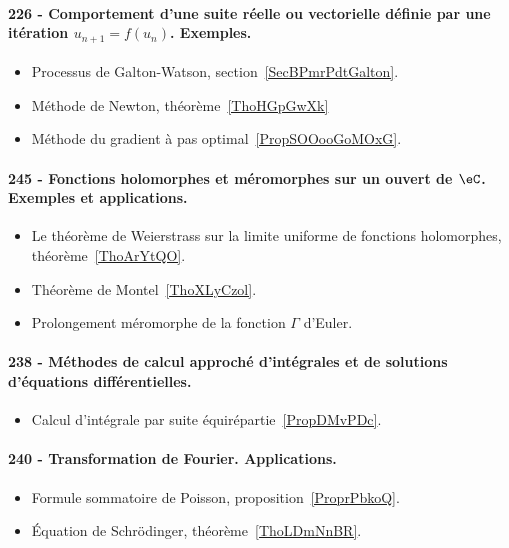 \paragraph{226 - Comportement d’une suite réelle ou vectorielle définie par une itération \( u_{n+1}=f(u_n)\). Exemples.}
\begin{itemize}
    \item Processus de Galton-Watson, section~\ref{SecBPmrPdtGalton}.
    \item Méthode de Newton, théorème~\ref{ThoHGpGwXk}
    \item Méthode du gradient à pas optimal~\ref{PropSOOooGoMOxG}.
\end{itemize}
\paragraph{245 - Fonctions holomorphes et méromorphes sur un ouvert de \( \eC\). Exemples et applications.}
\begin{itemize}
    \item Le théorème de Weierstrass sur la limite uniforme de fonctions holomorphes, théorème~\ref{ThoArYtQO}.
    \item Théorème de Montel~\ref{ThoXLyCzol}.
    \item Prolongement méromorphe de la fonction \( \Gamma\) d'Euler.
\end{itemize}
\paragraph{238 - Méthodes de calcul approché d'intégrales et de solutions d’équations différentielles.}
\begin{itemize}
    \item Calcul d'intégrale par suite équirépartie~\ref{PropDMvPDc}.
\end{itemize}
\paragraph{240 - Transformation de Fourier. Applications.}
\begin{itemize}
    \item Formule sommatoire de Poisson, proposition~\ref{ProprPbkoQ}.
    \item Équation de Schrödinger, théorème~\ref{ThoLDmNnBR}.
\end{itemize}
